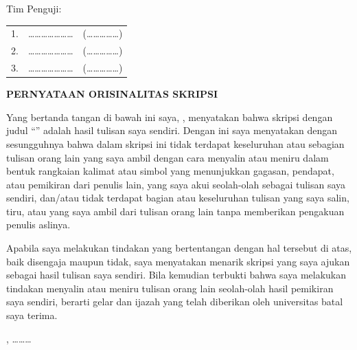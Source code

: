 \vspace{0.6cm}
\noindent Tim Penguji:

\vspace{0.4cm}
\begin{singlespace}
\noindent
\begin{tabular}{@{}p{0.6cm}p{8cm}p{6cm}@{}}
1. & \ldots\ldots\ldots\ldots\ldots\ldots\ldots & (\ldots\ldots\ldots\ldots\ldots) \\[1.2em]
2. & \ldots\ldots\ldots\ldots\ldots\ldots\ldots & (\ldots\ldots\ldots\ldots\ldots) \\[1.2em]
3. & \ldots\ldots\ldots\ldots\ldots\ldots\ldots & (\ldots\ldots\ldots\ldots\ldots) \\
\end{tabular}
\end{singlespace}

\clearpage
\begin{center}
\textbf{PERNYATAAN ORISINALITAS SKRIPSI}
\end{center}
\vspace{0.8cm}
\begin{singlespace}
\noindent Yang bertanda tangan di bawah ini saya, \NamaMahasiswa, menyatakan
bahwa skripsi dengan judul ``\JudulSkripsi'' adalah hasil tulisan saya sendiri.
Dengan ini saya menyatakan dengan sesungguhnya bahwa dalam skripsi ini tidak
terdapat keseluruhan atau sebagian tulisan orang lain yang saya ambil dengan
cara menyalin atau meniru dalam bentuk rangkaian kalimat atau simbol yang
menunjukkan gagasan, pendapat, atau pemikiran dari penulis lain, yang saya akui
seolah-olah sebagai tulisan saya sendiri, dan/atau tidak terdapat bagian atau
keseluruhan tulisan yang saya salin, tiru, atau yang saya ambil dari tulisan
orang lain tanpa memberikan pengakuan penulis aslinya.

\vspace{0.5cm}
\noindent Apabila saya melakukan tindakan yang bertentangan dengan hal tersebut
di atas, baik disengaja maupun tidak, saya menyatakan menarik skripsi yang saya
ajukan sebagai hasil tulisan saya sendiri. Bila kemudian terbukti bahwa saya
melakukan tindakan menyalin atau meniru tulisan orang lain seolah-olah hasil
pemikiran saya sendiri, berarti gelar dan ijazah yang telah diberikan oleh
universitas batal saya terima.
\end{singlespace}
\vspace{1.5cm}
\noindent\hfill \Kota, \ldots\ldots\ldots\ \Tahun

